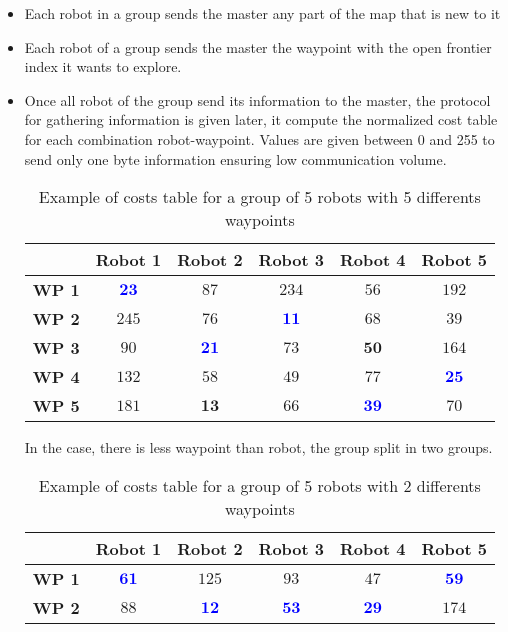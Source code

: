 \documentclass[main.tex]{subfiles}
\begin{document}
\begin{itemize}
	\item Each robot in a group sends the master any part of the map that is new to it
	\item Each robot of a group sends the master the waypoint with the open frontier index it wants to explore.
	\item Once all robot of the group send its information to the master, the protocol for gathering information is given later, it compute the normalized cost table for each combination robot-waypoint. Values are given between 0 and 255 to send only one byte information ensuring low communication volume. 
	
	\begin{table}[H]
		\centering
		\begin{tabular}{|c|c|c|c|c|c|}
			\hline
			& \textbf{Robot 1} & \textbf{Robot 2} & \textbf{Robot 3} & \textbf{Robot 4} & \textbf{Robot 5}\\
			\hline
			\textbf{WP 1} & \textcolor{blue}{$\mathbf{23}$} & $87$ & $234$ & $56$ & $192$ \\
			\hline
			\textbf{WP 2} & $245$ & $76$ & \textcolor{blue}{$\mathbf{11}$} & $68$ & $39$ \\
			\hline
			\textbf{WP 3} & $90$ & \textcolor{blue}{$\mathbf{21}$} & $73$ & $\mathbf{50}$ & $164$ \\
			\hline
			\textbf{WP 4} & $132$ & $58$ & $49$ & $77$ & \textcolor{blue}{$\mathbf{25}$} \\
			\hline
			\textbf{WP 5} & $181$ & $\mathbf{13}$ & $66$ & \textcolor{blue}{$\mathbf{39}$} & $70$ \\ 
			\hline
	
		\end{tabular}
		\caption{Example of costs table for a group of 5 robots with 5 differents waypoints}
		\label{tab:example_5R5WP}
	\end{table}
	
	In the case, there is less waypoint than robot, the group split in two groups.
	
	\begin{table}[H]
		\centering
		\begin{tabular}{|c|c|c|c|c|c|}
			\hline
			& \textbf{Robot 1} & \textbf{Robot 2} & \textbf{Robot 3} & \textbf{Robot 4} & \textbf{Robot 5}\\
			\hline
			\textbf{WP 1} & \textcolor{blue}{$\mathbf{61}$} & $125$ & $93$ & $47$ & \textcolor{blue}{$\mathbf{59}$} \\
			\hline
			\textbf{WP 2} & $88$ & \textcolor{blue}{$\mathbf{12}$} & \textcolor{blue}{$\mathbf{53}$} & \textcolor{blue}{$\mathbf{29}$} & $174$ \\ 
			\hline
		\end{tabular}
		\caption{Example of costs table for a group of 5 robots with 2 differents waypoints}
		\label{tab:example_5R2WP}
	\end{table}



\end{itemize}
\end{document}
